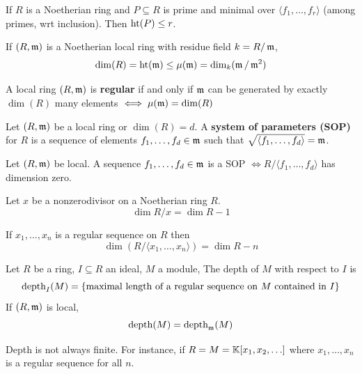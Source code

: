\documentclass[12pt]{amsart}
\begin{document}
\begin{theorem}
    If $R$ is a Noetherian ring and $P \subseteq R$ is prime and minimal over $\langle f_1, \ldots, f_r \rangle$ (among primes, wrt inclusion). Then $\operatorname{\text{ht}} (P) \leq r$.      
\end{theorem}

\begin{corollary}
    If $(R, \operatorname{\mathfrak{m}})$ is a Noetherian local ring with residue field $k = R/\operatorname{\mathfrak{m}}$, 
    \[\dim(R) = \operatorname{\text{ht}}(\operatorname{\mathfrak{m}}) \leq \mu (\operatorname{\mathfrak{m}}) = \dim_k (\operatorname{\mathfrak{m}}/\operatorname{\mathfrak{m}}^2)\]
\end{corollary}

\begin{definition}
    A local ring $(R, \operatorname{\mathfrak{m}})$ is \textbf{regular} if and only if $\operatorname{\mathfrak{m}}$ can be generated by exactly $\dim(R)$ many elements $\iff \mu(\operatorname{\mathfrak{m}}) = \dim(R)$
\end{definition}

\begin{definition}
    Let $(R, \operatorname{\mathfrak{m}})$ be a local ring or $\dim(R) = d$. A \textbf{system of parameters (SOP)} for $R$ is a sequence of elements $f_1, \ldots, f_d \in \operatorname{\mathfrak{m}}$ such that $\sqrt{\langle f_1, \ldots, f_d \rangle} = \operatorname{\mathfrak{m}}$. 
\end{definition}

\begin{lemma}
    Let $(R, \operatorname{\mathfrak{m}})$ be local. A sequence $f_1, \ldots, f_d \in \operatorname{\mathfrak{m}}$ is a SOP $\iff R/\langle f_1, \ldots, f_d \rangle $ has dimension zero. 
\end{lemma}

\begin{lemma}
    Let $x$ be a nonzerodivisor on a Noetherian ring $R$. 
    \[\dim R/x = \dim R - 1\]
\end{lemma}

\begin{corollary}
    If $x_1, \ldots, x_n$ is a regular sequence on $R$ then 
    \[\dim \left( R / \langle x_1, \ldots, x_n \rangle\right) = \dim R - n\]
\end{corollary}

\begin{definition}
    Let $R$ be a ring, $I \subseteq R$ an ideal, $M$ a module, The depth of $M$ with respect to $I$ is 
    \[\operatorname{\text{depth}}_I(M) = \{\text{maximal length of a regular sequence on $M$ contained in $I$}\}\] 
    If $(R, \operatorname{\mathfrak{m}})$ is local, 
    \[\operatorname{\text{depth}}(M) = \operatorname{\text{depth}}_{\operatorname{\mathfrak{m}}} (M)\] 
\end{definition}

\begin{example}
    Depth is not always finite. For instance, if $R = M = \mathbb K[x_1, x_2, \ldots]$ where $x_1, \ldots, x_n$ is a regular sequence for all $n$. 
\end{example}
\end{document}

